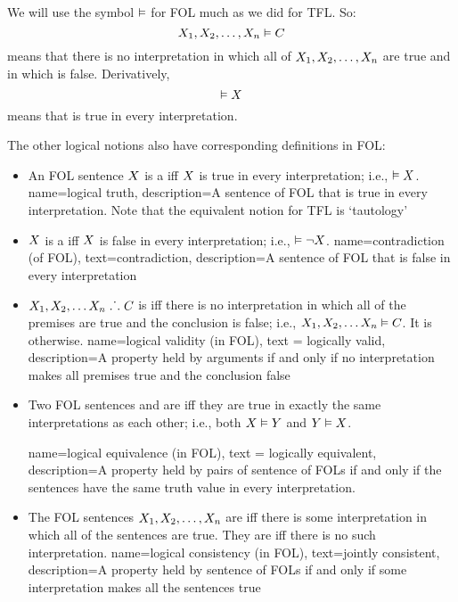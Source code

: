 We will use the symbol $\vDash$ for FOL much as we did for TFL. So:
	$$X_1, X_2, \ldots, X_n \vDash C$$
means that there is no interpretation in which all of $X_1, X_2, \ldots, X_n$ are true and in which  is false. Derivatively,
	$$\vDash X$$
means that \metaX is true in every interpretation.

The other logical notions also have corresponding definitions in FOL:

\begin{itemize}
\item An FOL sentence $X$ is a  iff $X$ is true in every interpretation; i.e.,  $\vDash X$.
{
name=logical truth,
description={A \gls{sentence of FOL} that is true in every \gls{interpretation}. Note that the equivalent notion for TFL is `tautology'}
}

\item $X$ is a  iff $X$ is false in every interpretation; i.e., $\vDash\neg X$.
{
  name=contradiction (of FOL),
  text=contradiction,
description={A \gls{sentence of FOL} that is false in every \gls{interpretation}}
}
  
\item $X_1, X_2, \ldots X_n \mathrel{\ldotp\dot{}\,\ldotp} C$ is  iff there is no interpretation in which all of the premises are true and the conclusion is false; i.e., $X_1,X_2,\ldots X_n \vDash C$. It is  otherwise.
{
  name=logical validity (in FOL),
  text = logically valid,
description={A property held by arguments if and only if no \gls{interpretation} makes all premises true and the conclusion false}
}

\item Two FOL sentences \metaX and \metaY are  iff they are true in exactly the same interpretations as each other; i.e., both $X\vDash Y$ and $Y\vDash X$.

{
  name=logical equivalence (in FOL),
  text = logically equivalent,
description={A property held by pairs of \glspl{sentence of FOL} if and only if the sentences have the same truth value in every \gls{interpretation}.}
}

\item The FOL sentences $X_1,X_2,\ldots, X_n$ are  iff there is some interpretation in which all of the sentences are true. They are  iff there is no such interpretation.
{
  name=logical consistency (in FOL),
  text=jointly consistent,
description={A property held by \glspl{sentence of FOL} if and only if some \gls{interpretation} makes all the sentences true}
}
\end{itemize}

